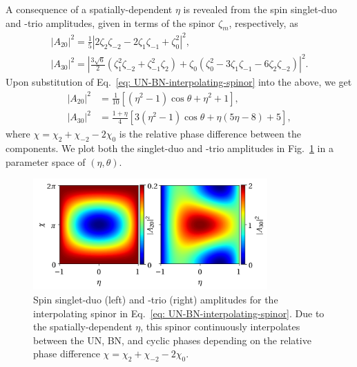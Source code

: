 A consequence of a spatially-dependent \(\eta \) is revealed from the spin
singlet-duo and -trio amplitudes, given in terms of the spinor \(\zeta_m\),
respectively, as
\begin{gather}\label{eq: a20definition}
    |A_{20}|^2 = \frac{1}{5}\left|2\zeta_2\zeta_{-2}-2\zeta_1\zeta_{-1}
    + \zeta_0^2\right|^2, \\
    |A_{30}|^2 = \left|\frac{3\sqrt{6}}{2}\left(\zeta_1^2\zeta_{-2}
    + \zeta_{-1}^2\zeta_2\right)
    + \zeta_0\left(\zeta_0^2-3\zeta_1\zeta_{-1}
    - 6\zeta_2\zeta_{-2}\right)\right|^2.
\end{gather}
Upon substitution of Eq.~\eqref{eq: UN-BN-interpolating-spinor} into the above,
we get
\begin{equation}
    \begin{aligned}
        |A_{20}|^2 & = \frac{1}{10} \left[(\eta^2-1)\cos\theta
        + \eta^2 + 1\right],                                          \\
        |A_{30}|^2 & = \frac{1+\eta}{4} \left[3\left(\eta ^2-1\right)
            \cos\theta
            + \eta(5 \eta -8) + 5\right],
    \end{aligned}
\end{equation}
where \(\chi = \chi_2 + \chi_{-2} - 2\chi_0\) is the relative phase difference
between the components.
We plot both the singlet-duo and -trio amplitudes in
Fig.~\ref{fig: UN-BN-duo-trio} in a parameter space of \((\eta, \theta)\).
\begin{figure}
    \centering
    \includegraphics[width=0.8\textwidth]{gfx/ch-spin2/a20-a30-varying.png}
    \caption[Spin-singlet duo and trio amplitudes in a parameter space of
        \(\chi \) and \(\eta \)]
    {\label{fig: UN-BN-duo-trio} Spin singlet-duo (left) and -trio
        (right) amplitudes for the interpolating spinor in
        Eq.~\eqref{eq: UN-BN-interpolating-spinor}.
        Due to the spatially-dependent \(\eta \), this spinor continuously
        interpolates between the UN, BN, and cyclic phases depending on the
        relative phase difference \(\chi=\chi_2+\chi_{-2}-2\chi_0\).}
\end{figure}
